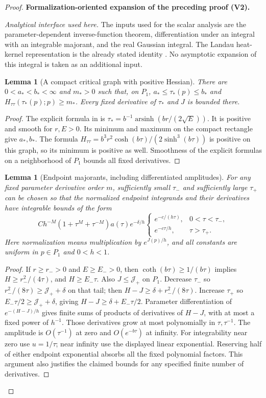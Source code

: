 \documentclass[11pt]{article}
\newtheorem{lemma}[theorem]{Lemma}
\newcommand{\formalisationparentid}{X}
\newenvironment{formalisationaddition}[1]{\par\medskip\begingroup\color{blue}\def\formalisationparentid{#1}\setcounter{formalizationsublemma}{0}\let\lemma\formalizationsublemma\let\endlemma\endformalizationsublemma
  \def\Eo{\mathcal E_h^\circ}\def\EE{\mathcal E_h}\def\phio{\phi_h^\circ}\def\phih{\phi_h}\def\Ho{H_h^{\rm atom}(v^\circ)}\def\Ha{H_h^{\rm atom}}\def\HL{H_h^{L}}\def\Dh{D_h}\def\Log{\operatorname{Log}}\def\ellh{\ell_h}\def\Gp{G_{p,h}}\def\Ast{A_{*,h}}\def\ahat{\widehat{\mathfrak a}_h}\def\ah{\mathfrak a_h}\def\rh{\widehat\rho_h}\def\deltah{\widehat\delta_h}\def\oldref##1{\textup{(##1)}}\def\interface##1{\par\noindent\textit{Analytical interface used here.} ##1\par}\def\finish{\par\noindent\textit{Conclusion of the formalization-oriented expansion.} }\par\noindent\textbf{Formalization-oriented expansion of the preceding proof (V2).}\par\smallskip
}{\par\endgroup\medskip
}
\newcommand{\cJ}{\mathcal J}
\begin{document}
\begin{proof}
\begin{formalisationaddition}{P2.3}
\interface{The inputs used for the scalar analysis are the parameter-dependent
inverse-function theorem, differentiation under an integral with an integrable
majorant, and the real Gaussian integral. The Landau heat-kernel representation
is the already stated identity \Cref{eq:K-integral}. No asymptotic expansion
of this integral is taken as an additional input.}

\begin{lemma}[A compact critical graph with positive Hessian]\label{sublemma:P2-3-critical-compact}
There are $0<a_*<b_*<\infty$ and $m_*>0$ such that, on $P_1$,
$a_*\le\tau_*(p)\le b_*$ and
$H_{\tau\tau}(\tau_*(p);p)\ge m_*$. Every fixed derivative of
$\tau_*$ and $J$ is bounded there.
\end{lemma}
\begin{proof}
The explicit formula in  is
$\tau_*=b^{-1}\operatorname{arsinh}(br/(2\sqrt E))$.
It is positive and smooth for $r,E>0$. Its minimum and maximum on the
compact rectangle give $a_*,b_*$. The formula
$H_{\tau\tau}=b^3r^2\cosh(b\tau)/(2\sinh^3(b\tau))$ is positive on
this graph, so its minimum is positive as well. Smoothness of the explicit
formulas on a neighborhood of $P_1$ bounds all fixed derivatives.
\end{proof}

\begin{lemma}[Endpoint majorants, including differentiated amplitudes]\label{sublemma:P2-3-endpoint-majorants}
For any fixed parameter derivative order $m$, sufficiently small $\tau_-$
and sufficiently large $\tau_+$ can be chosen so that the normalized
endpoint integrands and their derivatives have integrable bounds of the form
\[
 C h^{-M}(1+\tau^M+\tau^{-M})a(\tau)
 e^{-\delta/h}
 \begin{cases}e^{-c/(h\tau)},&0<\tau<\tau_-,\\
 e^{-c\tau/h},&\tau>\tau_+.
 \end{cases}
\]
Here normalization means multiplication by $e^{J(p)/h}$, and all constants
are uniform in $p\in P_1$ and $0<h<1$.
\end{lemma}
\begin{proof}
If $r\ge r_->0$ and $E\ge E_->0$, then
$\coth(b\tau)\ge1/(b\tau)$ implies $H\ge r_-^2/(4\tau)$,
and $H\ge E_-\tau$. Also $J\le \cJ_+$ on $P_1$.
Decrease $\tau_-$ so $r_-^2/(8\tau)\ge \cJ_++\delta$ on that tail;
then $H-J\ge\delta+r_-^2/(8\tau)$. Increase $\tau_+$ so
$E_-\tau/2\ge \cJ_++\delta$, giving $H-J\ge\delta+E_-\tau/2$.
Parameter differentiation of $e^{-(H-J)/h}$ gives finite sums of products
of derivatives of $H-J$, with at most a fixed power of $h^{-1}$.
Those derivatives grow at most polynomially in $\tau,\tau^{-1}$.
The amplitude is $O(\tau^{-1})$ at zero and $O(e^{-b\tau})$ at infinity.
For integrability near zero use $u=1/\tau$; near infinity use the displayed
linear exponential. Reserving half of either endpoint exponential absorbs
all the fixed polynomial factors. This argument also justifies the claimed
bounds for any specified finite number of derivatives.
\end{proof}


\end{formalisationaddition}
\end{proof}
\end{document}

